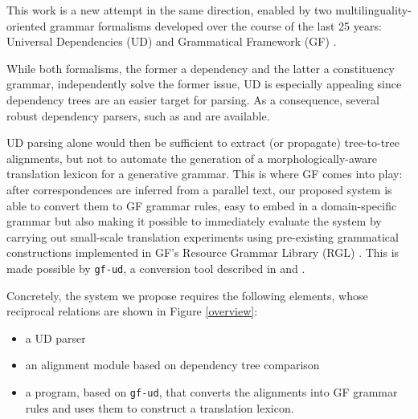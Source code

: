 \documentclass[11pt]{article}
\begin{document}
This work is a new attempt in the same direction, enabled by two multilinguality-oriented grammar formalisms developed over the course of the last 25 years: Universal Dependencies (UD) \cite{dummy} and Grammatical Framework (GF) \cite{dummy}.

While both formalisms, the former a dependency and the latter a constituency grammar, independently solve the former issue, UD is especially appealing since dependency trees are an easier target for parsing. 
As a consequence, several robust dependency parsers, such as \cite{dummy} and \cite{dummy} are available.

UD parsing alone would then be sufficient to extract (or propagate) tree-to-tree alignments, but not to automate the generation of a morphologically-aware translation lexicon for a generative grammar. 
This is where GF comes into play: after correspondences are inferred from a parallel text, our proposed system is able to convert them to GF grammar rules, easy to embed in a domain-specific grammar but also making it possible to immediately evaluate the system by carrying out small-scale translation experiments using pre-existing grammatical constructions implemented in GF's Resource Grammar Library (RGL) \cite{dummy}.  
This is made possible by \texttt{gf-ud}, a conversion tool described in \cite{dummy} and \cite{dummy}.

Concretely, the system we propose requires the following elements, whose reciprocal relations are shown in Figure \ref{overview}: \smallskip

\begin{itemize}
  \item a UD parser
  \item an alignment module based on dependency tree comparison
  \item a program, based on \texttt{gf-ud}, that converts the alignments into GF grammar rules and uses them to construct a translation lexicon.
\end{itemize} \smallskip
\end{document}
